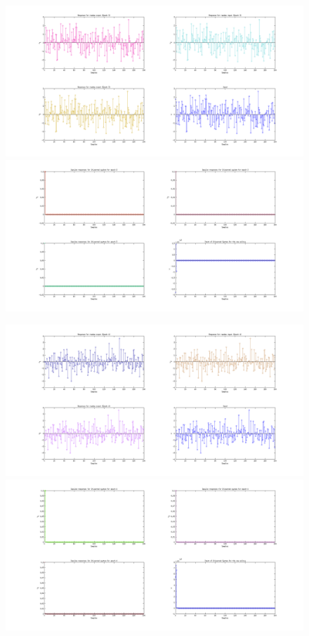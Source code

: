 \documentclass[a4paper,oneside,12pt]{article}
\begin{document}
\begin{figure}[H]
\centering
\includegraphics[scale=0.35]{s_3.png} \\
\includegraphics[scale=0.35]{q_3.png} \\
\label{}
\end{figure}

\begin{figure}[H]
\centering
\includegraphics[scale=0.35]{s_4.png} \\
\includegraphics[scale=0.35]{q_4.png} \\
\label{}
\end{figure}
\end{document}
